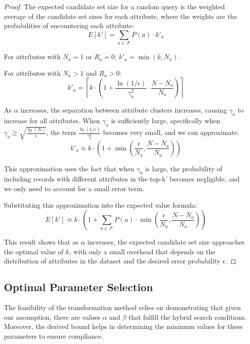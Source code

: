 \documentclass[numbers,sort]{article}
\begin{document}
\begin{proof}
The expected candidate set size for a random query is the weighted average of the candidate set sizes for each attribute, where the weights are the probabilities of encountering each attribute:
\begin{equation}
E[k'] = \sum_{a \in \mathcal{F}} P(a) \cdot k'_a
\end{equation}

For attributes with $N_a = 1$ or $R_a = 0$, $k'_a = \min(k, N_a)$.

For attributes with $N_a > 1$ and $R_a > 0$:
\begin{equation}
k'_a = \left\lceil k \cdot \left(1 + \frac{\ln(1/\epsilon)}{\gamma_a^2} \cdot \frac{N - N_a}{N_a}\right) \right\rceil
\end{equation}

As $\alpha$ increases, the separation between attribute clusters increases, causing $\gamma_a$ to increase for all attributes. When $\gamma_a$ is sufficiently large, specifically when $\gamma_a \geq \sqrt{\frac{\ln(N)}{\epsilon}}$, the term $\frac{\ln(1/\epsilon)}{\gamma_a^2}$ becomes very small, and we can approximate:
\begin{equation}
k'_a \approx k \cdot \left(1 + \min\left(\frac{\epsilon}{N_a}, \frac{N-N_a}{N_a}\right)\right)
\end{equation}

This approximation uses the fact that when $\gamma_a$ is large, the probability of including records with different attributes in the top-k' becomes negligible, and we only need to account for a small error term.

Substituting this approximation into the expected value formula:
\begin{equation}
E[k'] \approx k \cdot \left(1 + \sum_{a \in \mathcal{F}} P(a) \cdot \min\left(\frac{\epsilon}{N_a}, \frac{N-N_a}{N_a}\right)\right)
\end{equation}

This result shows that as $\alpha$ increases, the expected candidate set size approaches the optimal value of $k$, with only a small overhead that depends on the distribution of attributes in the dataset and the desired error probability $\epsilon$.
\end{proof}
\subsection{Optimal Parameter Selection}
The feasibility of the transformation method relies on demonstrating that given our assumption, there are values $\alpha$ and $\beta$ that fulfill the hybrid search conditions. Moreover, the derived bound helps in determining the minimum values for these parameters to ensure compliance.
\end{document}
